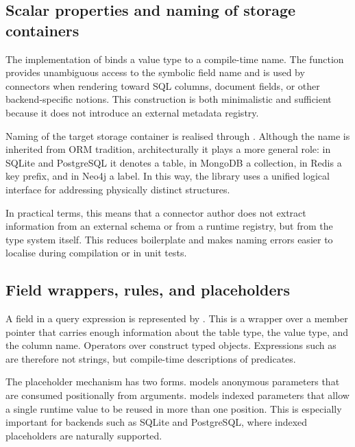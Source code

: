 \subsection{Scalar properties and naming of storage containers}

The implementation of  binds a value type to a compile-time name. The  function provides unambiguous access to the symbolic field name and is used by connectors when rendering toward SQL columns, document fields, or other backend-specific notions. This construction is both minimalistic and sufficient because it does not introduce an external metadata registry.

Naming of the target storage container is realised through . Although the name is inherited from ORM tradition, architecturally it plays a more general role: in SQLite and PostgreSQL it denotes a table, in MongoDB a collection, in Redis a key prefix, and in Neo4j a label. In this way, the library uses a unified logical interface for addressing physically distinct structures.

In practical terms, this means that a connector author does not extract information from an external schema or from a runtime registry, but from the type system itself. This reduces boilerplate and makes naming errors easier to localise during compilation or in unit tests.

\subsection{Field wrappers, rules, and placeholders}

A field in a query expression is represented by . This is a  wrapper over a member pointer that carries enough information about the table type, the value type, and the column name. Operators over  construct typed  objects. Expressions such as  are therefore not strings, but compile-time descriptions of predicates.

The placeholder mechanism has two forms.  models anonymous parameters that are consumed positionally from  arguments.  models indexed parameters that allow a single runtime value to be reused in more than one position. This is especially important for backends such as SQLite and PostgreSQL, where indexed placeholders are naturally supported.

